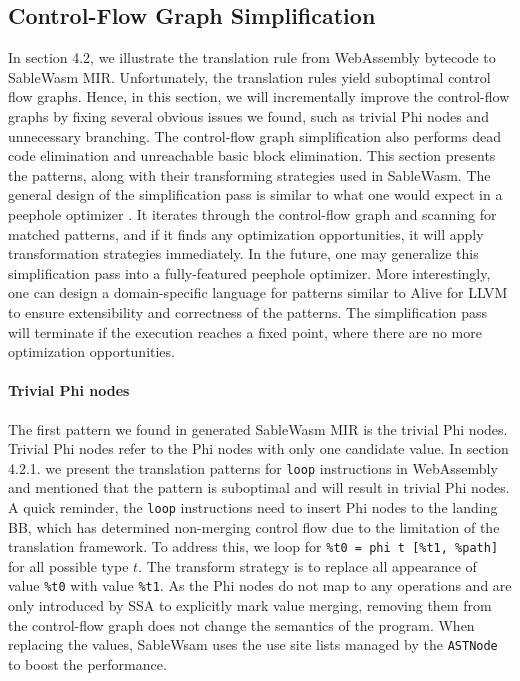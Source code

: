 \subsection{Control-Flow Graph Simplification}

In section 4.2, we illustrate the translation rule from WebAssembly bytecode to SableWasm MIR. Unfortunately, the translation rules yield suboptimal control flow graphs. Hence, in this section, we will incrementally improve the control-flow graphs by fixing several obvious issues we found, such as trivial Phi nodes and unnecessary branching. The control-flow graph simplification also performs dead code elimination and unreachable basic block elimination. This section presents the patterns, along with their transforming strategies used in SableWasm. The general design of the simplification pass is similar to what one would expect in a peephole optimizer \cite{peephole-opt}. It iterates through the control-flow graph and scanning for matched patterns, and if it finds any optimization opportunities, it will apply transformation strategies immediately. In the future, one may generalize this simplification pass into a fully-featured peephole optimizer. More interestingly, one can design a domain-specific language for patterns similar to Alive \cite{alive, alive-in-lean} for LLVM to ensure extensibility and correctness of the patterns. The simplification pass will terminate if the execution reaches a fixed point, where there are no more optimization opportunities.

\paragraph{Trivial Phi nodes} The first pattern we found in generated  SableWasm MIR is the trivial Phi nodes. Trivial Phi nodes refer to the Phi nodes with only one candidate value. In section 4.2.1. we present the translation patterns for \texttt{loop} instructions in WebAssembly and mentioned that the pattern is suboptimal and will result in trivial Phi nodes. A quick reminder, the \texttt{loop} instructions need to insert Phi nodes to the landing BB, which has determined non-merging control flow due to the limitation of the translation framework. To address this, we loop for \texttt{\%t0 = phi t [\%t1, \%path]} for all possible type $t$. The transform strategy is to replace all appearance of value \texttt{\%t0} with value \texttt{\%t1}. As the Phi nodes do not map to any operations and are only introduced by SSA to explicitly mark value merging, removing them from the control-flow graph does not change the semantics of the program. When replacing the values, SableWsam uses the use site lists managed by the \texttt{ASTNode} to boost the performance.

